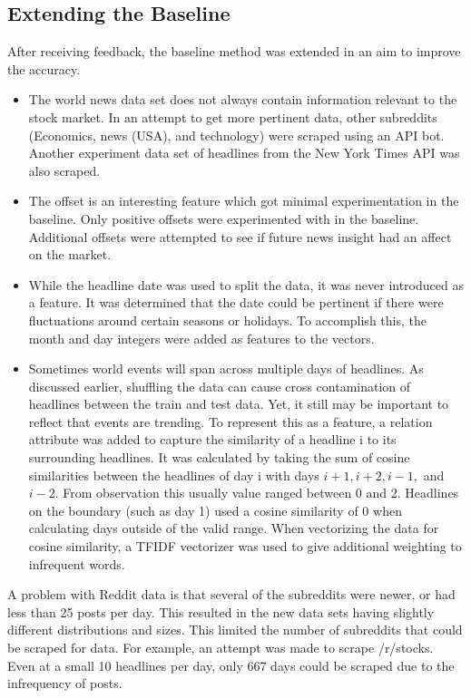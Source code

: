 \documentclass[11pt,a4paper]{article}
\begin{document}
\subsection{Extending the Baseline}
After receiving feedback, the baseline method was extended in an aim to improve the accuracy.
\begin{itemize}
\item The world news data set does not always contain information relevant to the stock market. In an attempt to get more pertinent data, other subreddits (Economics, news (USA), and technology) were scraped using an API bot. Another experiment data set of headlines from the New York Times API was also scraped.

\item The offset is an interesting feature which got minimal experimentation in the baseline. Only positive offsets were experimented with in the baseline. Additional offsets were attempted to see if future news insight had an affect on the market.

\item While the headline date was used to split the data, it was never introduced as a feature. It was determined that the date could be pertinent if there were fluctuations around certain seasons or holidays. To accomplish this, the month and day integers were added as features to the vectors.

\item Sometimes world events will span across multiple days of headlines. As discussed earlier, shuffling the data can cause cross contamination of headlines between the train and test data. Yet, it still may be important to reflect that events are trending. To represent this as a feature, a relation attribute was added to capture the similarity of a headline i to its surrounding headlines. It was calculated by taking the sum of cosine similarities between the headlines of day i with days $i+1,i+2,i-1,$ and $i-2$. From observation this usually value ranged between 0 and 2. Headlines on the boundary (such as day 1) used a cosine similarity of 0 when calculating days outside of the valid range. When vectorizing the data for cosine similarity, a TFIDF vectorizer was used to give additional weighting to infrequent words.
\end{itemize}

A problem with Reddit data is that several of the subreddits were newer, or had less than 25 posts per day. This resulted in the new data sets having slightly different distributions and sizes. This limited the number of subreddits that could be scraped for data. For example, an attempt was made to scrape /r/stocks. Even at a small 10 headlines per day, only 667 days could be scraped due to the infrequency of posts.
\end{document}

